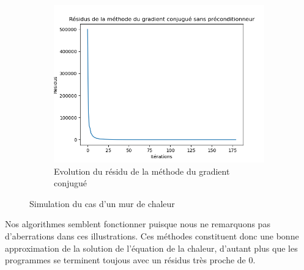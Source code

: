 \documentclass{article}
\begin{document}
\begin{figure}[ht]
\begin{subfigure}{0.25\textwidth}
    \centering
    \includegraphics[width=\linewidth]{Chaleur_2c.png}
    \caption{Evolution du résidu de la méthode du gradient conjugué}
    \label{subfig:heat_wall_residus}
  \end{subfigure}
  \caption{Simulation du cas d'un mur de chaleur}
  \label{fig:heat_wall}
\end{figure}

Nos algorithmes semblent fonctionner puisque nous ne remarquons pas d'aberrations dans ces illustrations. Ces méthodes constituent donc une bonne approximation de la solution de l'équation de la chaleur, d'autant plus que les programmes se terminent toujous avec un résidus très proche de 0.
\end{document}
